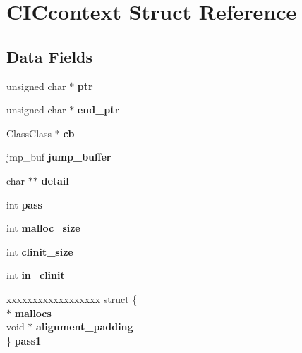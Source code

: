\section{CICcontext Struct Reference}
\label{struct_c_i_ccontext}
\subsection*{Data Fields}
\begin{DoxyCompactItemize}
\item 
unsigned char $\ast$ {\bfseries ptr}\label{struct_c_i_ccontext_a03aa05c1f9f9af8e017ce1aac47da1c7}

\item 
unsigned char $\ast$ {\bfseries end\_\-ptr}\label{struct_c_i_ccontext_a5a44074b3d245852fd43cef9e6a7d025}

\item 
ClassClass $\ast$ {\bfseries cb}\label{struct_c_i_ccontext_a70f91366eacb4bf65e7bab0571458acd}

\item 
jmp\_\-buf {\bfseries jump\_\-buffer}\label{struct_c_i_ccontext_a66f8edeb0041d47ad6e1758835dd3a3a}

\item 
char $\ast$$\ast$ {\bfseries detail}\label{struct_c_i_ccontext_a8ff9463453b8a6ff559a7dcfb4aa7f0e}

\item 
int {\bfseries pass}\label{struct_c_i_ccontext_aa6ba16420047ee830cbf7de2ade1aae0}

\item 
int {\bfseries malloc\_\-size}\label{struct_c_i_ccontext_a861cde4d6f9df0f1e955b7b791bb2f85}

\item 
int {\bfseries clinit\_\-size}\label{struct_c_i_ccontext_a9c0a42c8476dfad99891d58b257df6f4}

\item 
int {\bfseries in\_\-clinit}\label{struct_c_i_ccontext_afc8b315d7fec8c760c36a36ebbe94d8d}

\item 
\begin{tabbing}
xx\=xx\=xx\=xx\=xx\=xx\=xx\=xx\=xx\=\kill
struct \{\\
 $\ast$ {\bfseries mallocs}\\
\>void $\ast$ {\bfseries alignment\_padding}\\
\} {\bfseries pass1}\label{struct_c_i_ccontext_ae6bedf53b5ae31cb287e377714d5259c}
\\


\end{tabbing}
\end{DoxyCompactItemize}
